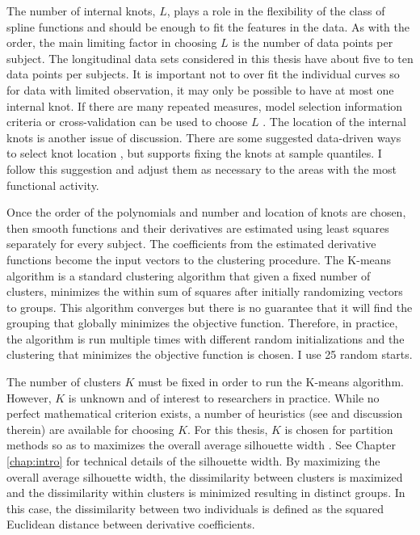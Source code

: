 The number of internal knots, $L$, plays a role in the flexibility of the class of spline functions and should be enough to fit the features in the data. As with the order, the main limiting factor in choosing $L$ is the number of data points per subject. The longitudinal data sets considered in this thesis have about five to ten data points per subjects. It is important not to over fit the individual curves so for data with limited observation, it may only be possible to have at most one internal knot. If there are many repeated measures, model selection information criteria or cross-validation can be used to choose $L$ \cite{rice2001}. The location of the internal knots is another issue of discussion. There are some suggested data-driven ways to select knot location \cite{shanggang2001}, but \textcite{ruppert2002} supports fixing the knots at sample quantiles. I follow this suggestion and adjust them as necessary to the areas with the most functional activity. 

Once the order of the polynomials and number and location of knots are chosen, then smooth functions and their derivatives are estimated using least squares separately for every subject. The coefficients from the estimated derivative functions become the input vectors to the clustering procedure. The K-means algorithm is a standard clustering algorithm that given a fixed number of clusters, minimizes the within sum of squares after initially randomizing vectors to groups. This algorithm converges but there is no guarantee that it will find the grouping that globally minimizes the objective function. Therefore, in practice, the algorithm is run multiple times with different random initializations and the clustering that minimizes the objective function is chosen. I use 25 random starts.

The number of clusters $K$ must be fixed in order to run the K-means algorithm. However, $K$ is unknown and of interest to researchers in practice. While no perfect mathematical criterion exists, a number of heuristics (see \cite{tibshirani2001} and discussion therein) are available for choosing $K$. For this thesis, $K$ is chosen for partition methods so as to maximizes the overall average silhouette width \cite{rousseeuw1987}. See Chapter \ref{chap:intro} for technical details of the silhouette width. By maximizing the overall average silhouette width, the dissimilarity between clusters is maximized and the dissimilarity within clusters is minimized resulting in distinct groups. In this case, the dissimilarity between two individuals is defined as the squared Euclidean distance between derivative coefficients.

